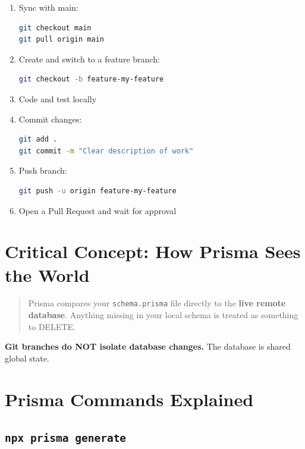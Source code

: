 \documentclass[11pt]{article}
\begin{document}
\begin{enumerate}
    \item Sync with main:
\begin{lstlisting}[language=bash]
git checkout main
git pull origin main
\end{lstlisting}

    \item Create and switch to a feature branch:
\begin{lstlisting}[language=bash]
git checkout -b feature-my-feature
\end{lstlisting}

    \item Code and test locally

    \item Commit changes:
\begin{lstlisting}[language=bash]
git add .
git commit -m "Clear description of work"
\end{lstlisting}

    \item Push branch:
\begin{lstlisting}[language=bash]
git push -u origin feature-my-feature
\end{lstlisting}

    \item Open a Pull Request and wait for approval
\end{enumerate}

\section{Critical Concept: How Prisma Sees the World}

\begin{quote}
Prisma compares your \texttt{schema.prisma} file directly to the \textbf{live remote database}.  
Anything missing in your local schema is treated as something to DELETE.
\end{quote}

\textbf{Git branches do NOT isolate database changes.}  
The database is shared global state.

\section{Prisma Commands Explained}

\subsection*{\texttt{npx prisma generate}}
\end{document}
